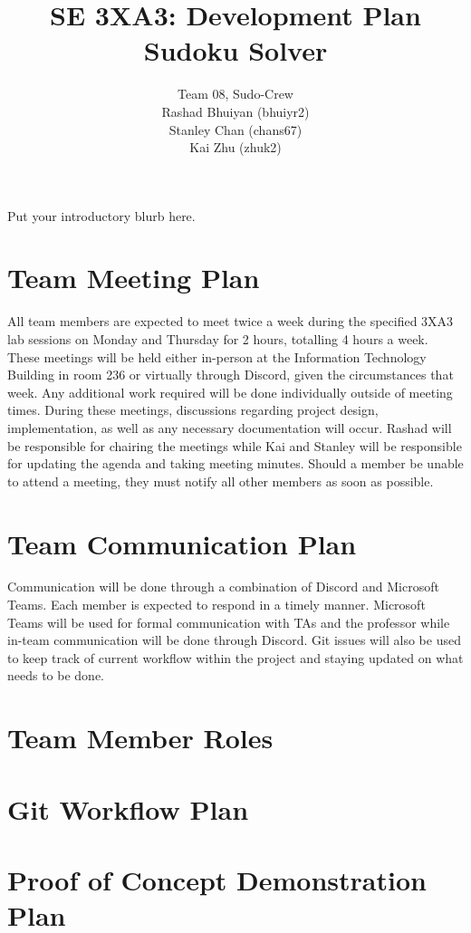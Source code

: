 \documentclass[11pt]{article}
\title{SE 3XA3: Development Plan\\Sudoku Solver}
\author{Team 08, Sudo-Crew
		\\ Rashad Bhuiyan (bhuiyr2)
		\\ Stanley Chan (chans67)
		\\ Kai Zhu (zhuk2)
}
\date{}
\begin{document}
\maketitle

Put your introductory blurb here.

\section{Team Meeting Plan}
All team members are expected to meet twice a week during the specified 3XA3 lab sessions on Monday and Thursday for 2 hours, totalling 4 hours a week. These meetings will be held either in-person at the Information Technology Building in room 236 or virtually through Discord, given the circumstances that week. Any additional work required will be done individually outside of meeting times. During these meetings, discussions regarding project design, implementation, as well as any necessary documentation will occur. Rashad will be responsible for chairing the meetings while Kai and Stanley will be responsible for updating the agenda and taking meeting minutes. Should a member be unable to attend a meeting, they must notify all other members as soon as possible. 

\section{Team Communication Plan}
Communication will be done through a combination of Discord and Microsoft Teams. Each member is expected to respond in a timely manner. Microsoft Teams will be used for formal communication with TAs and the professor while in-team communication will be done through Discord. Git issues will also be used to keep track of current workflow within the project and staying updated on what needs to be done.

\section{Team Member Roles}

\section{Git Workflow Plan}

\section{Proof of Concept Demonstration Plan}
\end{document}
